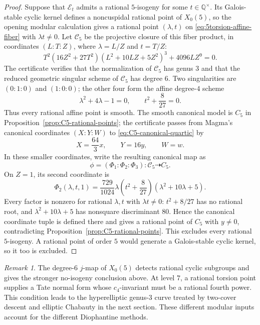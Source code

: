 \documentclass[11pt,a4paper]{amsart}
\theoremstyle{definition}
\theoremstyle{remark}
\newtheorem{remark}[theorem]{Remark}
\numberwithin{equation}{section}
\newcommand{\Q}{\mathbb{Q}}
\newcommand{\mathcalE}{\mathcal{E}}
\begin{document}
\begin{proof}
Suppose that \(\mathcalE_t\) admits a rational \(5\)-isogeny for some
\(t\in\Q^\times\). Its Galois-stable cyclic kernel defines a
noncuspidal rational point of \(X_0(5)\), so the opening modular
calculation gives a rational point \((\lambda,t)\) on
\eqref{eq:5torsion-affine-fiber} with \(\lambda t\neq0\).
Let \(\mathcal C_5\) be the projective closure of this fiber product,
in coordinates \((L:T:Z)\), where \(\lambda=L/Z\) and \(t=T/Z\):
\begin{equation}\label{eq:5torsion-projective-fiber}
T^2(16Z^2+27T^2)(L^2+10LZ+5Z^2)^3+4096LZ^9=0.
\end{equation}
The certificate verifies that the normalization of \(\mathcal C_5\)
has genus \(3\) and that the reduced geometric singular scheme of
\(\mathcal C_5\) has degree \(6\). Two singularities are \((0:1:0)\) and \((1:0:0)\); the other
four form the affine degree-\(4\) scheme
\[
\lambda^2+4\lambda-1=0,\qquad t^2+\frac{8}{27}=0.
\]
Thus every rational affine point is smooth. The smooth canonical model
is \(C_5\) in Proposition~\ref{prop:C5-rational-points}; the certificate
passes from Magma's canonical coordinates \mbox{\((X:Y:W)\)} to
\eqref{eq:C5-canonical-quartic} by
\[
X=\frac{64}{3}x,\qquad Y=16y,\qquad W=w.
\]
In these smaller coordinates, write the resulting canonical map as
\[
\phi=(\Phi_1:\Phi_2:\Phi_3):\mathcal C_5\dashrightarrow C_5.
\]
On \(Z=1\), its second coordinate is
\[
\Phi_2(\lambda,t,1)
=\frac{729}{1024}\lambda\left(t^2+\frac{8}{27}\right)
(\lambda^2+10\lambda+5).
\]
Every factor is nonzero for rational \(\lambda,t\) with
\(\lambda t\neq0\): \(t^2+8/27\) has no rational root, and
\(\lambda^2+10\lambda+5\) has nonsquare discriminant \(80\).
Hence the canonical coordinate tuple is defined there and gives a
rational point of \(C_5\) with \(y\neq0\), contradicting
Proposition~\ref{prop:C5-rational-points}. This excludes every rational
\(5\)-isogeny. A rational point of order \(5\) would generate a
Galois-stable cyclic kernel, so it too is excluded.
\end{proof}

\begin{remark}\label{rem:5-method}
The degree-\(6\) \(j\)-map of \(X_0(5)\) detects rational cyclic
subgroups and gives the stronger no-isogeny conclusion above. At level
\(7\), a rational torsion point supplies a Tate normal form whose
\(c_4\)-invariant must be a rational fourth power. This condition leads
to the hyperelliptic genus-\(3\) curve treated by two-cover descent and
elliptic Chabauty in the next section. These different modular inputs
account for the different Diophantine methods.
\end{remark}
\end{document}
